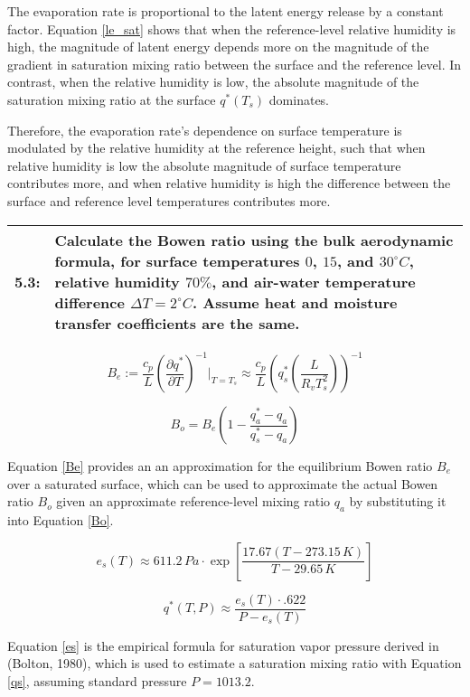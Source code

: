 \documentclass[12pt]{article}
\newcommand*{\problem}[2]{
    \begin{table}[ht]
    \centering
        \begin{tabular}{ | p{.1\linewidth} p{.9\linewidth} | }
            \hline
            \vspace{.3em}\textbf{\large#1:} & \vspace{.3em}\small{#2}\hspace{.2em}\vspace{.5em} \\ \hline
        \end{tabular}
    \end{table}
}
\begin{document}
The evaporation rate is proportional to the latent energy release by a constant factor. Equation \ref{le_sat} shows that when the reference-level relative humidity is high, the magnitude of latent energy depends more on the magnitude of the gradient in saturation mixing ratio between the surface and the reference level. In contrast, when the relative humidity is low, the absolute magnitude of the saturation mixing ratio at the surface $q^*(T_s)$ dominates.

Therefore, the evaporation rate's dependence on surface temperature is modulated by the relative humidity at the reference height, such that when relative humidity is low the absolute magnitude of surface temperature contributes more, and when relative humidity is high the difference between the surface and reference level temperatures contributes more.

\problem{5.3}{
    Calculate the Bowen ratio using the bulk aerodynamic formula, for surface temperatures $0$, $15$, and $30^\circ\si{C}$, relative humidity $70\%$, and air-water temperature difference $\Delta T = 2^\circ\si{C}$. Assume heat and moisture transfer coefficients are the same.
}

\begin{equation}\label{Be}
    B_e := \frac{c_p}{L} \left(\frac{\partial q^*}{\partial T}\right)^{-1} \vert_{T=T_s} \approx \frac{c_p}{L} \left(q^*_s\left(\frac{L}{R_vT_s^2}\right)\right)^{-1}
\end{equation}

\begin{equation}\label{Bo}
    B_o = B_e \left(1-\frac{q^*_a - q_a}{q^*_s - q_a}\right)
\end{equation}

Equation \ref{Be} provides an an approximation for the equilibrium Bowen ratio $B_e$ over a saturated surface,  which can be used to approximate the actual Bowen ratio $B_o$ given an approximate reference-level mixing ratio $q_a$ by substituting it into Equation \ref{Bo}.

\begin{equation}\label{es}
    e_s(T) \approx 611.2\,\si{Pa} \cdot \exp\left[\frac{17.67(T-273.15\,\si{K})}{T-29.65\,\si{K}}\right]
\end{equation}

\begin{equation}\label{qs}
    q^*(T,P) \approx \frac{e_s(T) \cdot .622}{P-e_s(T)}
\end{equation}

Equation \ref{es} is the empirical formula for saturation vapor pressure derived in (Bolton, 1980), which is used to estimate a saturation mixing ratio with Equation \ref{qs}, assuming standard pressure $P = 1013.2$.
\end{document}

